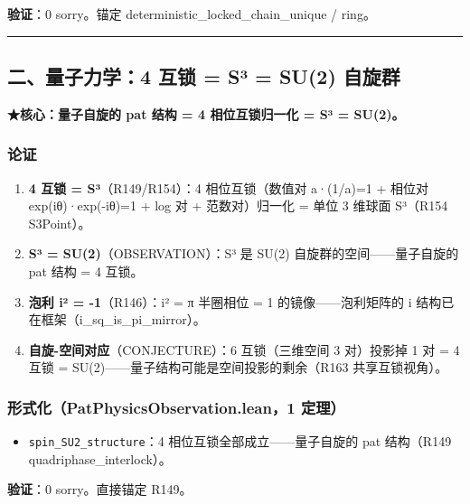 \documentclass[
]{article}
\providecommand{\tightlist}{%
 \setlength{\itemsep}{0pt}\setlength{\parskip}{0pt}}
\begin{document}
\textbf{验证}：0 sorry。锚定 deterministic\_locked\_chain\_unique /
ring。

\begin{center}\rule{0.5\linewidth}{0.5pt}\end{center}

\subsection{二、量子力学：4 互锁 = S³ = SU(2)
自旋群}\label{ux4e8cux91cfux5b50ux529bux5b664-ux4e92ux9501-suxb3-su2-ux81eaux65cbux7fa4}

\textbf{★核心：量子自旋的 pat 结构 = 4 相位互锁归一化 = S³ = SU(2)。}

\subsubsection{论证}\label{ux8bbaux8bc1-1}

\begin{enumerate}
\def\labelenumi{\arabic{enumi}.}
\tightlist
\item
 \textbf{4 互锁 = S³}（R149/R154）：4 相位互锁（数值对 a·(1/a)=1 +
 相位对 exp(iθ)·exp(-iθ)=1 + log 对 + 范数对）归一化 = 单位 3 维球面
 S³（R154 S3Point）。
\item
 \textbf{S³ = SU(2)}（OBSERVATION）：S³ 是 SU(2)
 自旋群的空间------量子自旋的 pat 结构 = 4 互锁。
\item
 \textbf{泡利 i² = -1}（R146）：i² = π 半圈相位 = 1
 的镜像------泡利矩阵的 i 结构已在框架（i\_sq\_is\_pi\_mirror）。
\item
 \textbf{自旋-空间对应}（CONJECTURE）：6 互锁（三维空间 3 对）投影掉 1
 对 = 4 互锁 = SU(2)------量子结构可能是空间投影的剩余（R163
 共享互锁视角）。
\end{enumerate}

\subsubsection{形式化（PatPhysicsObservation.lean，1
定理）}\label{ux5f62ux5f0fux5316patphysicsobservation.lean1-ux5b9aux7406}

\begin{itemize}
\tightlist
\item
 \texttt{spin\_SU2\_structure}：4 相位互锁全部成立------量子自旋的 pat
 结构（R149 quadriphase\_interlock）。
\end{itemize}

\textbf{验证}：0 sorry。直接锚定 R149。
\end{document}
